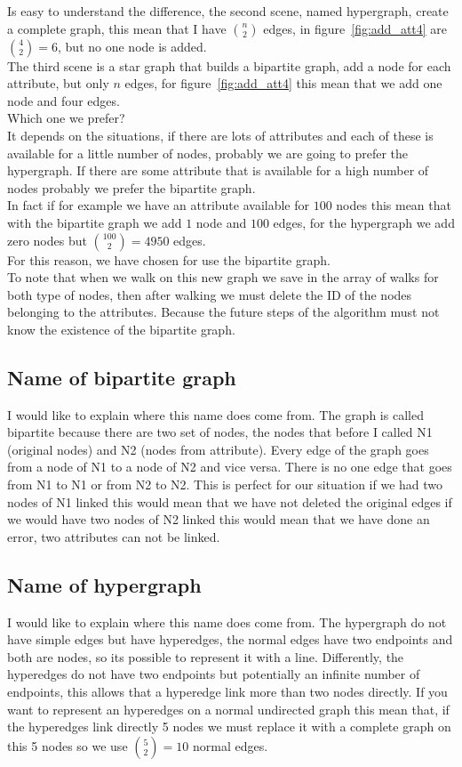 Is easy to understand the difference, the second scene, named hypergraph, create a complete graph, this mean that I have  $ \displaystyle\binom{n}{2}$ edges, in figure~\ref{fig:add_att4} are $ \displaystyle\binom{4}{2} = 6$, but no one node is added.\\
The third scene is a star graph that builds a bipartite graph, add a node for each attribute, but only $n$ edges, for figure~\ref{fig:add_att4} this mean that we add one node and four edges.\\
Which one we prefer?\\
It depends on the situations, if there are lots of attributes and each of these is available for a little number of nodes, probably we are going to prefer the hypergraph. If there are some attribute that is available for a high number of nodes probably we prefer the bipartite graph.\\
In fact if for example we have an attribute available for $100$ nodes this mean that with the bipartite graph we add $1$ node and $100$ edges, for the hypergraph we add zero nodes but $ \displaystyle\binom{100}{2} = 4950$ edges.\\
For this reason, we have chosen for use the bipartite graph.\\
To note that when we walk on this new graph we save in the array of walks for both type of nodes, then after walking we must delete the ID of the nodes belonging to the attributes. Because the future steps of the algorithm must not know the existence of the bipartite graph.
%
\subsection{Name of bipartite graph}
I would like to explain where this name does come from. The graph is called bipartite because there are two set of nodes, the nodes that before I called N1 (original nodes) and N2 (nodes from attribute). Every edge of the graph goes from a node of N1 to a node of N2 and vice versa. There is no one edge that goes from N1 to N1 or from N2 to N2. This is perfect for our situation if we had two nodes of N1 linked this would mean that we have not deleted the original edges if we would have two nodes of N2 linked this would mean that we have done an error, two attributes can not be linked.
%
\subsection{Name of hypergraph}
I would like to explain where this name does come from. The hypergraph do not have simple edges but have hyperedges, the normal edges have two endpoints and both are nodes, so its possible to represent it with a line. Differently, the hyperedges do not have two endpoints but potentially an infinite number of endpoints, this allows that a hyperedge link more than two nodes directly. If you want to represent an hyperedges on a normal undirected graph this mean that, if the hyperedges link directly 5 nodes we must replace it with a complete graph on this 5 nodes so we use $ \displaystyle\binom{5}{2} = 10$ normal edges.


